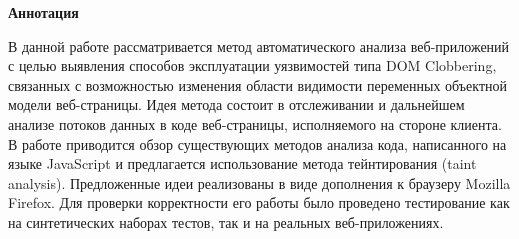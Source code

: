 
\setlength{\parskip}{0pt}
\begin{center}
	{\LARGE{\textbf{Аннотация}} \par}
\end{center}
\bigskip
     В данной работе рассматривается метод автоматического анализа веб-приложений с целью выявления способов эксплуатации уязвимостей типа DOM Clobbering, связанных с возможностью изменения области видимости переменных объектной модели веб-страницы. Идея метода состоит в отслеживании и дальнейшем анализе потоков данных в коде веб-страницы, исполняемого на стороне клиента.
     В работе приводится обзор существующих методов анализа кода, написанного на языке JavaScript и предлагается использование метода тейнтирования (taint analysis).
     Предложенные идеи реализованы в виде дополнения к браузеру Mozilla Firefox. Для проверки корректности его работы было проведено тестирование как на синтетических наборах тестов, так и на реальных веб-приложениях.
\bigskip



